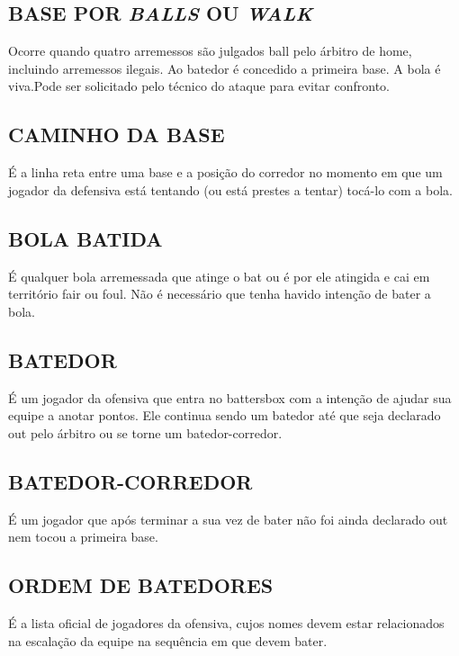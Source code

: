 \subsection{BASE POR \textit{BALLS} OU \textit{WALK}}
Ocorre quando quatro arremessos são julgados \gls{ball} pelo árbitro de \gls{home}, incluindo arremessos ilegais. Ao batedor é concedido a primeira base. A bola é viva.Pode ser solicitado pelo técnico do ataque para evitar confronto.

\subsection{CAMINHO DA BASE}
É a linha reta entre uma base e a posição do corredor no momento em que um jogador da defensiva está tentando (ou está prestes a tentar) tocá-lo com a bola.

\subsection{BOLA BATIDA}
É qualquer bola arremessada que atinge o \gls{bat} ou é por ele atingida e cai em território \gls{fair} ou \gls{foul}. Não é necessário que tenha havido intenção de bater a bola.

\subsection{BATEDOR}
É um jogador da ofensiva que entra no \gls{battersbox} com a intenção de ajudar sua equipe a anotar pontos. Ele continua sendo um batedor até que seja declarado \gls{out} pelo árbitro ou se torne um batedor-corredor.

\subsection{BATEDOR-CORREDOR}
É um jogador que após terminar a sua vez de bater não foi ainda declarado \gls{out} nem tocou a primeira base.

\subsection{ORDEM DE BATEDORES}
É a lista oficial de jogadores da ofensiva, cujos nomes devem estar relacionados na escalação da equipe na sequência em que devem bater.
